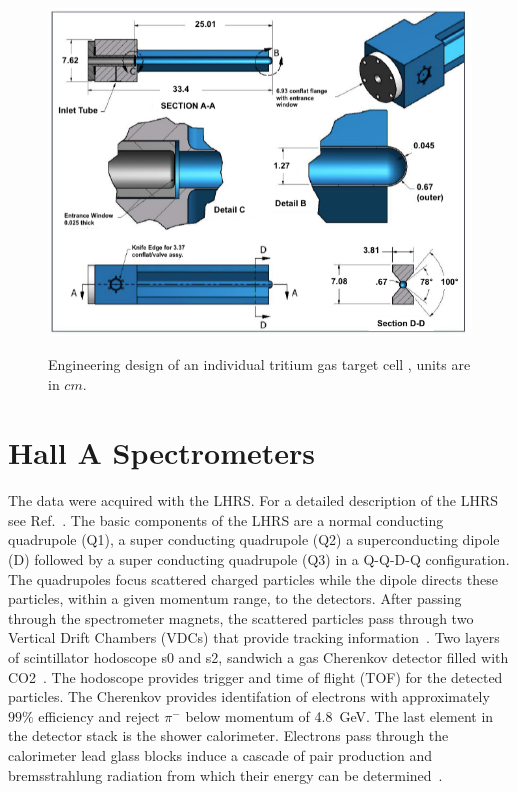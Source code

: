 \documentclass[final,5p,times,twocolumn]{elsarticle}
\begin{document}
\begin{figure}[!h]
\centering
  \includegraphics[width=13cm]{images/tritium_cell.jpg}\\
  \caption{Engineering design of an individual tritium gas target cell \cite{celldes}, units are in $cm$.
 }\label{cell}
\end{figure}


\section{Hall A Spectrometers}

The data were acquired with the LHRS. For a detailed description of the LHRS see Ref.~\cite{Alcorn:2004sb}. The basic components of the LHRS 
are a normal conducting quadrupole (Q1), a super conducting quadrupole (Q2) a superconducting dipole (D) followed by a super conducting 
quadrupole (Q3) in a Q-Q-D-Q configuration. The quadrupoles focus scattered charged particles while the dipole directs these particles, 
within a given momentum range, to the detectors. After passing through the spectrometer magnets, the scattered particles pass through 
two Vertical Drift Chambers (VDCs) that provide tracking information~\cite{Fissum:2001st}. 
Two layers of scintillator hodoscope s0 and s2, sandwich a gas 
Cherenkov detector filled with CO2~\cite{Iodice:1998ft}.  The hodoscope provides trigger and time of flight (TOF) for the detected particles.  
The Cherenkov provides identifation of electrons with approximately $99\%$ efficiency and reject $\pi^{-}$ below momentum of 4.8~GeV.  
The last element in the detector stack is the shower calorimeter. Electrons pass through the calorimeter lead glass blocks 
induce a cascade of pair production and bremsstrahlung radiation from which their energy can be determined~\cite{Alcorn:2004sb}.
\end{document}

